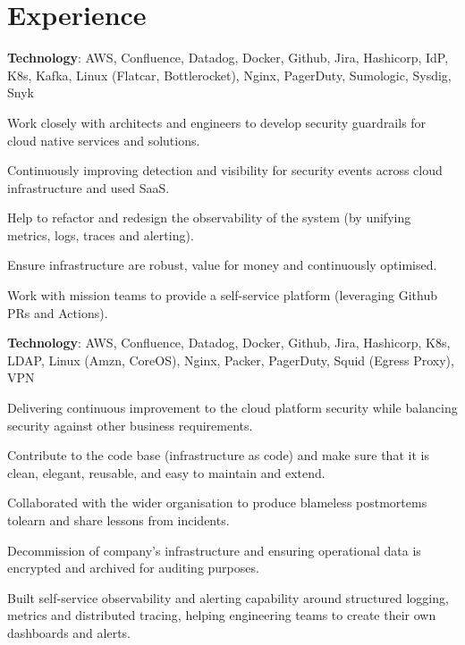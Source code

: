 \documentclass[]{cv}
\begin{document}
\begin{minipage}[t]{0.70\textwidth}
\section{Experience}\label{sec:experience}
\sectionsep
\textbf{Technology}: AWS, Confluence, Datadog, Docker, Github, Jira, Hashicorp, IdP, K8s, Kafka, Linux (Flatcar, Bottlerocket), Nginx, PagerDuty, Sumologic, Sysdig, Snyk
\sectionsep
\begin{tightemize}
\item Work closely with architects and engineers to develop security guardrails for cloud native services and solutions.
\item Continuously improving detection and visibility for security events across cloud infrastructure and used SaaS.
\item Help to refactor and redesign the observability of the system (by unifying metrics, logs, traces and alerting).
\item Ensure infrastructure are robust, value for money and continuously optimised.
\item Work with mission teams to provide a self-service platform (leveraging Github PRs and Actions).
\end{tightemize}
\sectionsep
\sectionsep
{}
\sectionsep
\textbf{Technology}: AWS, Confluence, Datadog, Docker, Github, Jira, Hashicorp, K8s, LDAP, Linux (Amzn, CoreOS), Nginx, Packer, PagerDuty, Squid (Egress Proxy), VPN
\sectionsep
\begin{tightemize}
\item Delivering continuous improvement to the cloud platform security while balancing security against other business requirements.
\item Contribute to the code base (infrastructure as code) and make sure that it is clean, elegant, reusable, and easy to maintain and extend.
\item Collaborated with the wider organisation to produce blameless postmortems tolearn and share lessons from incidents.
\item Decommission of company's infrastructure and ensuring operational data is encrypted and archived for auditing purposes.
\item Built self-service observability and alerting capability around structured logging, metrics and distributed tracing, helping engineering teams to create their own dashboards and alerts.

\end{tightemize}
\end{minipage}
\end{document}
